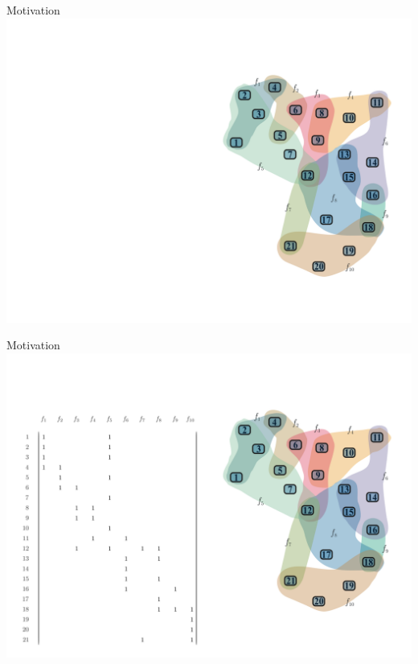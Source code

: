 \documentclass[10pt]{beamer}
\begin{document}
\begin{frame}[fragile]{Motivation}
    \vspace*{-3em}\hspace*{-2em}\includegraphics[width=1.15\textwidth]{Images/LSAExample/00}
\end{frame}

\begin{frame}[fragile]{Motivation}
    \vspace*{-3em}\hspace*{-2em}\includegraphics[width=1.15\textwidth]{Images/LSAExample/01}
\end{frame}
\end{document}
